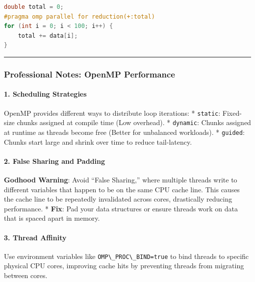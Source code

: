 \begin{lstlisting}[language={C++}]
double total = 0;
#pragma omp parallel for reduction(+:total)
for (int i = 0; i < 100; i++) {
    total += data[i];
}
\end{lstlisting}

\begin{center}\rule{0.5\linewidth}{0.5pt}\end{center}

\hypertarget{professional-notes-openmp-performance}{%
\subsubsection{Professional Notes: OpenMP
Performance}\label{professional-notes-openmp-performance}}

\hypertarget{scheduling-strategies}{%
\paragraph{1. Scheduling Strategies}\label{scheduling-strategies}}

OpenMP provides different ways to distribute loop iterations: *
\passthrough{\lstinline!static!}: Fixed-size chunks assigned at compile
time (Low overhead). * \passthrough{\lstinline!dynamic!}: Chunks
assigned at runtime as threads become free (Better for unbalanced
workloads). * \passthrough{\lstinline!guided!}: Chunks start large and
shrink over time to reduce tail-latency.

\hypertarget{false-sharing-and-padding}{%
\paragraph{2. False Sharing and
Padding}\label{false-sharing-and-padding}}

\textbf{Godhood Warning}: Avoid ``False Sharing,'' where multiple
threads write to different variables that happen to be on the same CPU
cache line. This causes the cache line to be repeatedly invalidated
across cores, drastically reducing performance. * \textbf{Fix}: Pad your
data structures or ensure threads work on data that is spaced apart in
memory.

\hypertarget{thread-affinity}{%
\paragraph{3. Thread Affinity}\label{thread-affinity}}

Use environment variables like
\passthrough{\lstinline!OMP\_PROC\_BIND=true!} to bind threads to
specific physical CPU cores, improving cache hits by preventing threads
from migrating between cores.

